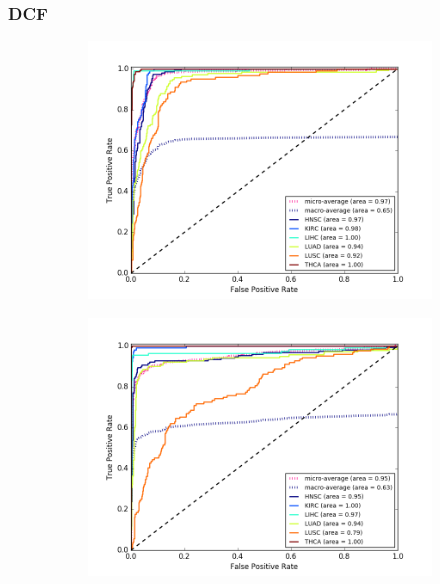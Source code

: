 \subsubsection{DCF}

\begin{figure}[H]
     \centering
     \begin{subfigure}[b]{0.49\textwidth}
         \centering
         \includegraphics[width=\textwidth]{img/m_s/m_s_dcf_dgmu_roc.png}
         \caption{}
     \end{subfigure}
     \hfill
     \begin{subfigure}[b]{0.49\textwidth}
         \centering
         \includegraphics[width=\textwidth]{img/m_s/m_s_dcf_gmu_roc.png}

\end{subfigure}
\end{figure}
